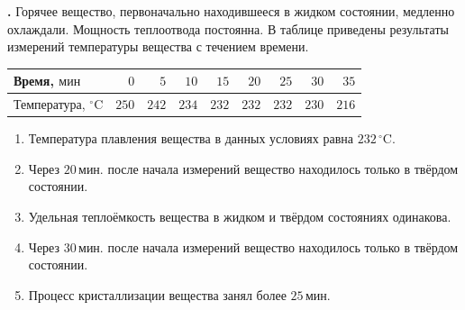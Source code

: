 \documentclass[12pt,a4paper]{article}
\newif\ifShowSolutions
\newcounter{banktask}
\newcommand{\BankTask}[3]{%
  \refstepcounter{banktask}%
  \Needspace{35mm}\par\medskip\noindent\begin{minipage}{\linewidth}%
  \noindent\textbf{\thebanktask.}\quad #2\par
  \ifShowSolutions
    #3\par
    \ifdefined\TutorEdition
      \ifcsname TutorSource#1\endcsname
        \smallskip{\small\csname TutorSource#1\endcsname\par}%
      \fi
    \fi
  \fi
  \end{minipage}\par\medskip
}
\begin{document}
\BankTask{35852E}{
Горячее вещество, первоначально находившееся в жидком состоянии, медленно охлаждали. Мощность теплоотвода постоянна. В таблице приведены результаты измерений температуры вещества с течением времени.
\begin{center}
\begin{tabular}{|l|r|r|r|r|r|r|r|r|}
\hline
Время, $\text{мин}$ & \(0\) & \(5\) & \(10\) & \(15\) & \(20\) & \(25\) & \(30\) & \(35\) \\
\hline
Температура, \({}^{\circ}\mathrm{C}\) & \(250\) & \(242\) & \(234\) & \(232\) & \(232\) & \(232\) & \(230\) & \(216\) \\
\hline
\end{tabular}
\end{center}
\begin{enumerate}
\item Температура плавления вещества в данных условиях равна \(232\,{}^{\circ}\mathrm{C}\).
\item Через \(20\,\text{мин}\). после начала измерений вещество находилось только в твёрдом состоянии.
\item Удельная теплоёмкость вещества в жидком и твёрдом состояниях одинакова.
\item Через \(30\,\text{мин}\). после начала измерений вещество находилось только в твёрдом состоянии.
\item Процесс кристаллизации вещества занял более \(25\,\text{мин}\).
\end{enumerate}
}{
\smallskip\noindent\textbf{Решение от GPT}\par
\begin{enumerate}
\item Верно: участок постоянной температуры соответствует кристаллизации, поэтому \(T_{\text{пл}}=232\,{}^{\circ}\mathrm{C}\).
\item Неверно: в момент \(t=20\,\text{мин}\) идёт кристаллизация, присутствуют жидкая и твёрдая фазы.
\item Неверно: при постоянной мощности \(P=mc\lvert\Delta T/\Delta t\rvert\). Скорости охлаждения жидкости и твёрдого вещества равны соответственно \(8/5=1{,}6\) и \(14/5=2{,}8\,{}^{\circ}\mathrm{C}/\text{мин}\); теплоёмкости различны.
\item Верно: через \(30\,\text{мин}\) температура \(230\,{}^{\circ}\mathrm{C}\) ниже температуры кристаллизации, вещество полностью затвердело.
\item Неверно: кристаллизация началась после \(10\,\text{мин}\) и завершилась до \(30\,\text{мин}\), поэтому её длительность меньше \(20\,\text{мин}\).
\end{enumerate}
Ответ: \(14\).
}
\end{document}
